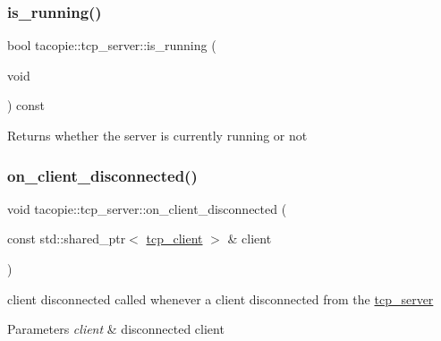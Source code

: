 \subsubsection{\texorpdfstring{is\+\_\+running()}{is\_running()}}
{\footnotesize\ttfamily bool tacopie\+::tcp\+\_\+server\+::is\+\_\+running (\begin{DoxyParamCaption}\item[{void}]{ }\end{DoxyParamCaption}) const}

\begin{DoxyReturn}{Returns}
whether the server is currently running or not 
\end{DoxyReturn}
\mbox{\label{classtacopie_1_1tcp__server_ad98bdefae28be6b16a213bf5bedbf7d9}} 
\subsubsection{\texorpdfstring{on\+\_\+client\+\_\+disconnected()}{on\_client\_disconnected()}}
{\footnotesize\ttfamily void tacopie\+::tcp\+\_\+server\+::on\+\_\+client\+\_\+disconnected (\begin{DoxyParamCaption}\item[{const std\+::shared\+\_\+ptr$<$ \hyperlink{classtacopie_1_1tcp__client}{tcp\+\_\+client} $>$ \&}]{client }\end{DoxyParamCaption})\hspace{0.3cm}{\ttfamily [private]}}

client disconnected called whenever a client disconnected from the \hyperlink{classtacopie_1_1tcp__server}{tcp\+\_\+server}


\begin{DoxyParams}{Parameters}
{\em client} & disconnected client \\
\hline
\end{DoxyParams}
\mbox{\label{classtacopie_1_1tcp__server_a62b4b67ab9554b27881be8dbe869cc6e}} 

